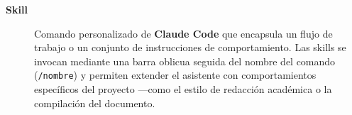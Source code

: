 \begin{description}
    \item [\hypertarget{skill}{\textbf{Skill}}]
    Comando personalizado de \textbf{Claude Code} que encapsula un flujo de trabajo
    o un conjunto de instrucciones de comportamiento. Las skills se invocan mediante
    una barra oblicua seguida del nombre del comando (\texttt{/nombre}) y permiten
    extender el asistente con comportamientos específicos del proyecto —como el
    estilo de redacción académica o la compilación del documento.

\end{description}

\endinput
